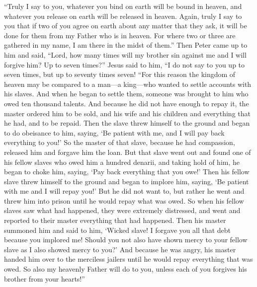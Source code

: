 \begin{biblechapter}
\verse “Truly I say to you, whatever you bind on earth will be bound in heaven, and whatever you release on earth will be released in heaven.
\verse Again, truly I say to you that if two of you agree on earth about any matter that they ask, it will be done for them from my Father who is in heaven.
\verse For where two or three are gathered in my name, I am there in the midst of them.”
 Then Peter came up to him and said, “Lord, how many times will my brother sin against me and I will forgive him? Up to seven times?”
\verse Jesus said to him, “I do not say to you up to seven times, but up to seventy times seven!
\verse “For this reason the kingdom of heaven may be compared to a man—a king—who wanted to settle accounts with his slaves.
\verse And when he began to settle them, someone was brought to him who owed ten thousand talents.
\verse And because he did not have enough to repay it, the master ordered him to be sold, and his wife and his children and everything that he had, and to be repaid.
\verse Then the slave threw himself to the ground and began to do obeisance to him, saying, ‘Be patient with me, and I will pay back everything to you!’
\verse So the master of that slave, because he had compassion, released him and forgave him the loan.
\verse But that slave went out and found one of his fellow slaves who owed him a hundred denarii, and taking hold of him, he began to choke him, saying, ‘Pay back everything that you owe!’
\verse Then his fellow slave threw himself to the ground and began to implore him, saying, ‘Be patient with me and I will repay you!’
\verse But he did not want to, but rather he went and threw him into prison until he would repay what was owed.
\verse So when his fellow slaves saw what had happened, they were extremely distressed, and went and reported to their master everything that had happened.
\verse Then his master summoned him and said to him, ‘Wicked slave! I forgave you all that debt because you implored me!
\verse Should you not also have shown mercy to your fellow slave as I also showed mercy to you?’
\verse And because he was angry, his master handed him over to the merciless jailers until he would repay everything that was owed.
\verse So also my heavenly Father will do to you, unless each of you forgives his brother from your hearts!”
\end{biblechapter}

